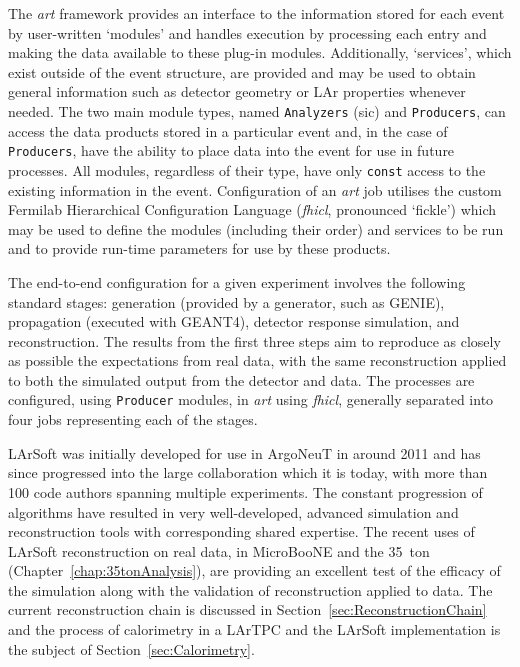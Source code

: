 The \textit{art} framework provides an interface to the information stored for each event by user-written `modules' and handles execution by processing each entry and making the data available to these plug-in modules.  Additionally, `services', which exist outside of the event structure, are provided and may be used to obtain general information such as detector geometry or LAr properties whenever needed.  The two main module types, named \texttt{Analyzers} (sic) and \texttt{Producers}, can access the data products stored in a particular event and, in the case of \texttt{Producers}, have the ability to place data into the event for use in future processes.  All modules, regardless of their type, have only \texttt{const} access to the existing information in the event.  Configuration of an \textit{art} job utilises the custom Fermilab Hierarchical Configuration Language (\textit{fhicl}, pronounced `fickle') which may be used to define the modules (including their order) and services to be run and to provide run-time parameters for use by these products.

The end-to-end configuration for a given experiment involves the following standard stages: generation (provided by a generator, such as GENIE), propagation (executed with GEANT4), detector response simulation, and reconstruction.  The results from the first three steps aim to reproduce as closely as possible the expectations from real data, with the same reconstruction applied to both the simulated output from the detector and data.  The processes are configured, using \texttt{Producer} modules, in \textit{art} using \textit{fhicl}, generally separated into four jobs representing each of the stages.

LArSoft was initially developed for use in ArgoNeuT in around 2011 and has since progressed into the large collaboration which it is today, with more than 100 code authors spanning multiple experiments.  The constant progression of algorithms have resulted in very well-developed, advanced simulation and reconstruction tools with corresponding shared expertise.  The recent uses of LArSoft reconstruction on real data, in MicroBooNE \cite{MicroBooNEReconstruction2017} and the 35~ton (Chapter~\ref{chap:35tonAnalysis}), are providing an excellent test of the efficacy of the simulation along with the validation of reconstruction applied to data.  The current reconstruction chain is discussed in Section~\ref{sec:ReconstructionChain} and the process of calorimetry in a LArTPC and the LArSoft implementation is the subject of Section~\ref{sec:Calorimetry}.

